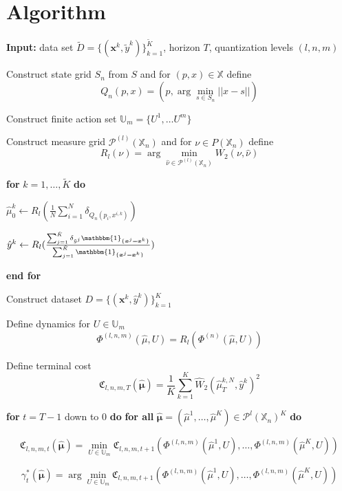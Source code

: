 \documentclass{article}
\begin{document}
\section{Algorithm}

\begin{algorithm}
\caption{Next Token Prediction with Dynamic Programming}
\begin{algorithmic}[1]

\State \textbf{Input:} data set $\tilde D = \{(\bm x ^k, \tilde y^k)\}_{k=1}^ {\tilde K}$, horizon $T$, quantization levels $(l, n, m)$

\State Construct state grid $S_n$ from $S$ and for $(p,x) \in \mathbb X$ define 
$$Q_n(p, x) = (p, \arg \min_{s \in S_n}||x-s||)$$

\State Construct finite action set $\mathbb U_m = \{U^1, \dots U^m\}$

\State Construct measure grid $\mathcal P^{(l)} (\mathbb X_n)$ and for $\nu \in P(\mathbb X_n)$ define 
$$R_l(\nu)  = \arg \min _{\hat \nu \in \mathcal P^{(l)} (\mathbb X_n)} W_2(\nu, \hat \nu)$$

\State \textbf{for} $k = 1, \dots , \tilde K$ \textbf{do}

\State \quad $\hat \mu_0^k \leftarrow R_l (\frac{1}{N}\sum _{i=1}^N\delta_{Q_n(p_i, x^{i,k})})$

\State \quad $\hat y^k \leftarrow R_l( {\frac{
\sum_{j=1}^{\tilde {K}} \delta _ {\tilde y^j} \mathbbm{1}_{\{\bm{x}^j = \bm{x}^k\}}}{\sum_{j=1}^{\tilde {K}} \mathbbm{1}_{\{\bm{x}^j = \bm{x}^k\}}}})$

\State \textbf{end for}

\State Construct dataset $D = \{(\bm x ^k, \hat y^k)\}_{k=1}^K$ 

\State Define dynamics for $U \in \mathbb U _m$
$$\Phi ^{(l, n, m)}(\hat \mu, U) = R_l(\Phi^{(n)}(\hat \mu, U))$$

\State Define terminal cost $$\mathfrak C _ {l, n, m, T} (\hat {\bm \mu}) = \frac{1}{K}\sum _{k = 1}^K \hat W_{2}(\hat \mu^{k, N}_T ,\hat y^k)^2$$

\State \textbf{for} $t = T-1$ down to $0$ \textbf{do}
\State \quad \textbf{for all} $\hat{\bm \mu} = (\hat \mu ^1, \dots , \hat \mu ^K) \in \mathcal P^l(\mathbb X_n)^K$ \textbf{do} 

\State \quad \quad 
$$\mathfrak C _ {l, n, m, t} (\hat {\bm \mu}) = \min_{U \in \mathbb U_m} \mathfrak C _ {l, n, m, t+1} (\Phi ^{(l, n, m)}(\hat {\mu}^1, U), \dots ,\Phi ^{(l, n, m)}(\hat {\mu}^K, U))$$

\State \quad \quad 
$$\gamma ^*_t(\hat {\bm \mu}) = \arg \min _{U \in \mathbb{U}_m} \mathfrak C _ {l, n, m, t+1} (\Phi ^{(l, n, m)}(\hat {\mu}^1, U), \dots ,\Phi ^{(l, n, m)}(\hat {\mu}^K, U))$$


\end{algorithmic}
\end{algorithm}
\end{document}
